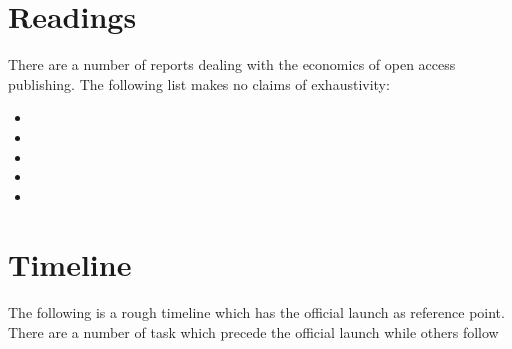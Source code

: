 \documentclass[nonflat,modfonts,output=book] {langsci/langscibook}
\begin{document}
\chapter{Readings} 
There are a number of reports dealing with the economics of open access publishing. The following list makes no claims of exhaustivity:

\sloppy
\begin{itemize}
\item {}
\item {} 
\item {}
\item {}
\item {}
\end{itemize}
\fussy




\chapter{Timeline}
The following is a rough timeline which has the official launch as reference point. There are a number of task which precede the official launch while others follow
\end{document}
